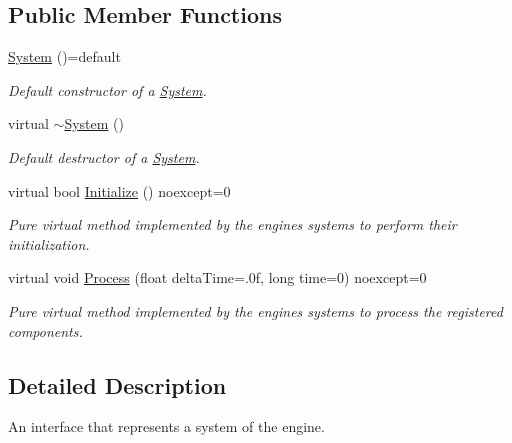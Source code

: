 \subsection*{Public Member Functions}
\begin{DoxyCompactItemize}
\item 
\mbox{\label{class_blade_1_1_system_ae054619742f8d87d127b518afe965020}} 
\hyperlink{class_blade_1_1_system_ae054619742f8d87d127b518afe965020}{System} ()=default
\begin{DoxyCompactList}\small\item\em Default constructor of a \hyperlink{class_blade_1_1_system}{System}. \end{DoxyCompactList}\item 
\mbox{\label{class_blade_1_1_system_ab6dc82c3981b9da6170595e47b56dffd}} 
virtual \hyperlink{class_blade_1_1_system_ab6dc82c3981b9da6170595e47b56dffd}{$\sim$\+System} ()
\begin{DoxyCompactList}\small\item\em Default destructor of a \hyperlink{class_blade_1_1_system}{System}. \end{DoxyCompactList}\item 
virtual bool \hyperlink{class_blade_1_1_system_a63fa00af40dc54d093300eff4785f26f}{Initialize} () noexcept=0
\begin{DoxyCompactList}\small\item\em Pure virtual method implemented by the engine\textquotesingle{}s systems to perform their initialization. \end{DoxyCompactList}\item 
virtual void \hyperlink{class_blade_1_1_system_a80c186f5f9f8fa4fd317b861853fe6a8}{Process} (float delta\+Time=.\+0f, long time=0) noexcept=0
\begin{DoxyCompactList}\small\item\em Pure virtual method implemented by the engine\textquotesingle{}s systems to process the registered components. \end{DoxyCompactList}\end{DoxyCompactItemize}


\subsection{Detailed Description}
An interface that represents a system of the engine. 

